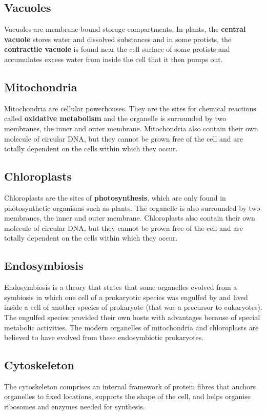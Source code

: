 \documentclass[11pt]{article}
\begin{document}
\subsection{Vacuoles}
\label{sec:orgbca71fe}
Vacuoles are membrane-bound storage compartments. In plants, the \textbf{central vacuole} stores water and dissolved substances and in some protists, the \textbf{contractile vacuole} is found near the cell surface of some protists and accumulates excess water from inside the cell that it then pumps out.
\subsection{Mitochondria}
\label{sec:org47e5057}
Mitochondria are cellular powerhouses. They are the sites for chemical reactions called \textbf{oxidative metabolism} and the organelle is surrounded by two membranes, the inner and outer membrane. Mitochondria also contain their own molecule of circular DNA, but they cannot be grown free of the cell and are totally dependent on the cells within which they occur.
\subsection{Chloroplasts}
\label{sec:org8877576}
Chloroplasts are the sites of \textbf{photosynthesis}, which are only found in photosynthetic organisms such as plants. The organelle is also surrounded by two membranes, the inner and outer membrane. Chloroplasts also contain their own molecule of circular DNA, but they cannot be grown free of the cell and are totally dependent on the cells within which they occur.
\subsection{Endosymbiosis}
\label{sec:orgde32923}
Endosymbiosis is a theory that states that some organelles evolved from a symbiosis in which one cell of a prokaryotic species was engulfed by and lived inside a cell of another species of prokaryote (that was a precursor to eukaryotes). The engulfed species provided their own hosts with advantages because of special metabolic activities. The modern organelles of mitochondria and chloroplasts are believed to have evolved from these endosymbiotic prokaryotes.

\newpage
\subsection{Cytoskeleton}
\label{sec:orgc04f6cd}
The cytoskeleton comprises an internal framework of protein fibres that anchors organelles to fixed locations, supports the shape of the cell, and helps organise ribosomes and enzymes needed for synthesis.
\end{document}
